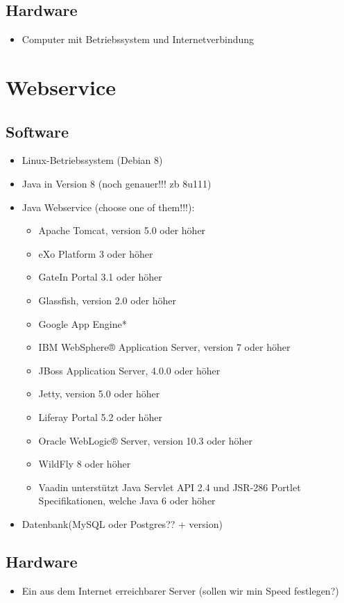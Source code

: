 \subsection{Hardware}
\begin{itemize} 
\item Computer mit Betriebssystem und Internetverbindung
\end{itemize}

\section{Webservice}
\subsection{Software}
\begin{itemize} 
\item Linux-Betriebssystem (Debian 8)
\item Java in Version 8 (noch genauer!!! zb 8u111)
\item Java Webservice (choose one of them!!!):
	\begin{itemize}
		\item Apache Tomcat, version 5.0 oder h\"oher
    		\item eXo Platform 3 oder h\"oher
    		\item GateIn Portal 3.1 oder h\"oher
    		\item Glassfish, version 2.0 oder h\"oher
    		\item Google App Engine*
    		\item IBM WebSphere® Application Server, version 7 oder h\"oher
    		\item JBoss Application Server, 4.0.0 oder h\"oher
    		\item Jetty, version 5.0 oder h\"oher
    		\item Liferay Portal 5.2 oder h\"oher
    		\item Oracle WebLogic® Server, version 10.3 oder h\"oher
    		\item WildFly 8 oder h\"oher

		\item Vaadin unterst\"utzt Java Servlet API 2.4 und JSR-286 Portlet Specifikationen, welche Java 6 oder h\"oher
	\end{itemize}
\item Datenbank(MySQL oder Postgres?? + version)
\end{itemize}
\subsection{Hardware}
\begin{itemize} 
\item Ein aus dem Internet erreichbarer Server (sollen wir min Speed festlegen?)
\end{itemize}